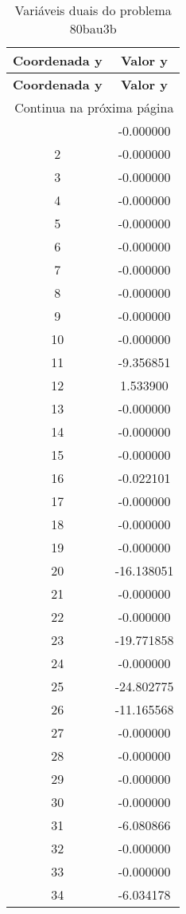 \documentclass[12pt]{article}
\begin{document}
\begin{longtable}{@{}cc@{}}
\caption{Variáveis duais do problema 80bau3b} \\
\toprule
\textbf{Coordenada y} & \textbf{Valor y} \\
\midrule
\endfirsthead

\toprule
\textbf{Coordenada y} & \textbf{Valor y} \\
\midrule
\endhead

\midrule \multicolumn{2}{r}{{Continua na próxima página}} \\ \midrule
\endfoot

\bottomrule
\endlastfoot
1 & -0.000000 \\
2 & -0.000000 \\
3 & -0.000000 \\
4 & -0.000000 \\
5 & -0.000000 \\
6 & -0.000000 \\
7 & -0.000000 \\
8 & -0.000000 \\
9 & -0.000000 \\
10 & -0.000000 \\
11 & -9.356851 \\
12 & 1.533900 \\
13 & -0.000000 \\
14 & -0.000000 \\
15 & -0.000000 \\
16 & -0.022101 \\
17 & -0.000000 \\
18 & -0.000000 \\
19 & -0.000000 \\
20 & -16.138051 \\
21 & -0.000000 \\
22 & -0.000000 \\
23 & -19.771858 \\
24 & -0.000000 \\
25 & -24.802775 \\
26 & -11.165568 \\
27 & -0.000000 \\
28 & -0.000000 \\
29 & -0.000000 \\
30 & -0.000000 \\
31 & -6.080866 \\
32 & -0.000000 \\
33 & -0.000000 \\
34 & -6.034178 \\

\end{longtable}
\end{document}
